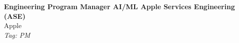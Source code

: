 \documentclass[11pt]{article}
\begin{document}
\begin{center}
  {\LARGE \textbf{Engineering Program Manager AI/ML Apple Services Engineering (ASE)}} \\[4pt]
  {\large Apple} \\[2pt]
  {\small \textit{Tag: PM}}
\end{center}

\vspace{1em}
\noindent
\end{document}
